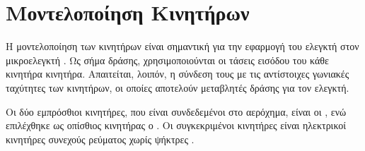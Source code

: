 \section{Μοντελοποίηση Κινητήρων}
\noindent Η μοντελοποίηση των κινητήρων είναι σημαντική για την εφαρμογή του 
ελεγκτή στον μικροελεγκτή . Ως σήμα δράσης, χρησιμοποιούνται οι 
τάσεις εισόδου του κάθε κινητήρα κινητήρα. Απαιτείται, λοιπόν, η σύνδεση τους με
τις αντίστοιχες γωνιακές ταχύτητες των κινητήρων, οι οποίες αποτελούν μεταβλητές 
δράσης για τον ελεγκτή. 

Οι δύο εμπρόσθιοι κινητήρες, που είναι συνδεδεμένοι στο αερόχημα, 
είναι οι , ενώ επιλέχθηκε ως οπίσθιος 
κινητήρας ο . Οι συγκεκριμένοι κινητήρες είναι 
ηλεκτρικοί κινητήρες συνεχούς ρεύματος χωρίς ψήκτρες .


